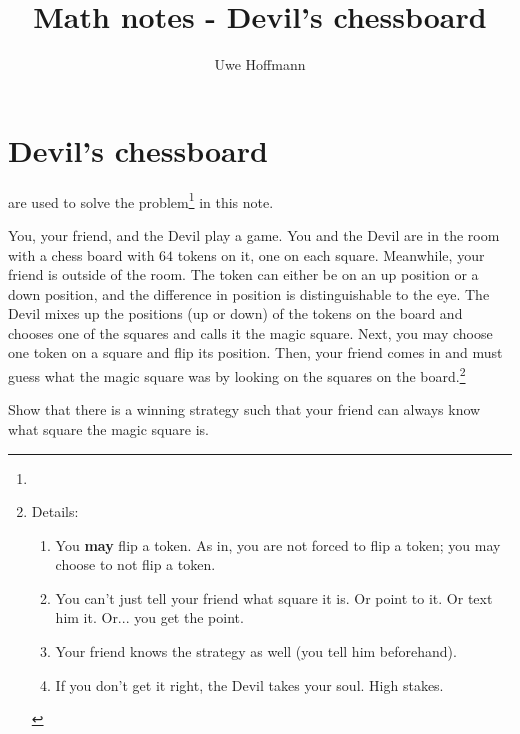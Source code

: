 

\title{Math notes - Devil's chessboard}
\author{Uwe Hoffmann}



\setcounter{chapter}{1}
\section*{Devil's chessboard}

 are used to solve the problem\footnote{} in this note.

You, your friend, and the Devil play a game. You and the Devil are in the room with a chess board with $64$ tokens on it, one on each square. Meanwhile, your friend is outside of the room. The token can either be on an up position or a down position, and the difference in position is distinguishable to the eye. The Devil mixes up the positions (up or down) of the tokens on the board and chooses one of the  squares and calls it the magic square. Next, you may choose one token on a square and flip its position. Then, your friend comes in and must guess what the magic square was by looking on the squares on the board.\footnote{
Details:
\\
\begin{enumerate}
\item You \textbf{may} flip a token. As in, you are not forced to flip a token; you may choose to not flip a token.

\item You can't just tell your friend what square it is. Or point to it. Or text him it. Or... you get the point.

\item Your friend knows the strategy as well (you tell him beforehand).

\item If you don't get it right, the Devil takes your soul. High stakes.
\end{enumerate}}

\vspace{10 mm}
\begin{problem}
Show that there is a winning strategy such that your friend can always know what square the magic square is.
\end{problem}

